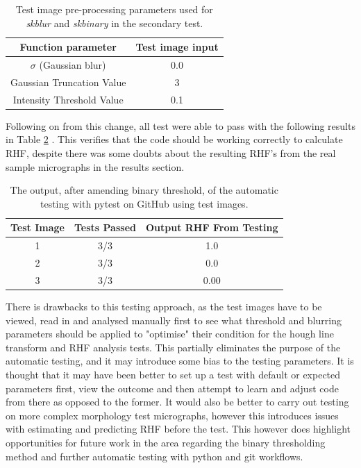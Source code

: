 \documentclass{article}
\begin{document}
    \begin{table}[h]
        \centering
        \begin{tabular}{|c|c|}
        \hline
            \textbf{Function parameter} & \textbf{Test image input}  \\
            \hline
            $\sigma$ (Gaussian blur) & 0.0 \\
            \hline
            Gaussian Truncation Value & 3 \\
            \hline
            Intensity Threshold Value & 0.1 \\ 
        \hline
        \end{tabular}
    \caption{Test image pre-processing parameters used for \textit{skblur} and \textit{skbinary} in the secondary test.}
    \label{tab:TestImageTable2}
    \end{table}
    Following on from this change, all test were able to pass with the following results in Table \ref{TestResults2} . This verifies that the code should be working correctly to calculate RHF, despite there was some doubts about the resulting RHF's from the real sample micrographs in the results section.
    
    \begin{table}[h]
    \centering
    \begin{tabular}{|c|c|c|}
    \hline
        \textbf{Test Image} & \textbf{Tests Passed} & \textbf{Output RHF From Testing}  \\
        \hline
        1 & 3/3 & 1.0 \\
        \hline
        2 & 3/3 & 0.0 \\
        \hline
        3 & 3/3 & 0.00 \\
        \hline
    \end{tabular}
    \caption{The output, after amending binary threshold, of the automatic testing with pytest on GitHub using test images.}
    \label{TestResults2}
\end{table}
    
    There is drawbacks to this testing approach, as the test images have to be viewed, read in and analysed manually first to see what threshold and blurring parameters should be applied to "optimise" their condition for the hough line transform and RHF analysis tests. This partially eliminates the purpose of the automatic testing, and it may introduce some bias to the testing parameters. It is thought that it may have been better to set up a test with default or expected parameters first, view the outcome and then attempt to learn and adjust code from there as opposed to the former. It would also be better to carry out testing on more complex morphology test micrographs, however this introduces issues with estimating and predicting RHF before the test. This however does highlight opportunities for future work in the area regarding the binary thresholding method and further automatic testing with python and git workflows.
\end{document}
